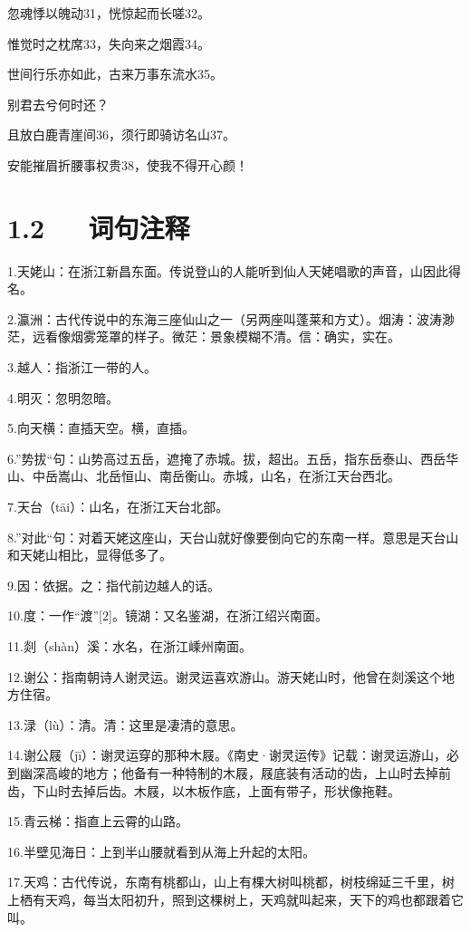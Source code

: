 \documentclass[letterpaper,12pt,english]{sphinxmanual}
\begin{document}
忽魂悸以魄动31，恍惊起而长嗟32。

惟觉时之枕席33，失向来之烟霞34。

世间行乐亦如此，古来万事东流水35。

别君去兮何时还？

且放白鹿青崖间36，须行即骑访名山37。

安能摧眉折腰事权贵38，使我不得开心颜！


\section{1.2   词句注释}
\label{\detokenize{p01_u6563_u6587/_u674e_u767d-_u68a6_u6e38_u5929_u59e5_u541f_u7559_u522b:id4}}
1.天姥山：在浙江新昌东面。传说登山的人能听到仙人天姥唱歌的声音，山因此得名。

2.瀛洲：古代传说中的东海三座仙山之一（另两座叫蓬莱和方丈）。烟涛：波涛渺茫，远看像烟雾笼罩的样子。微茫：景象模糊不清。信：确实，实在。

3.越人：指浙江一带的人。

4.明灭：忽明忽暗。

5.向天横：直插天空。横，直插。

6.”势拔“句：山势高过五岳，遮掩了赤城。拔，超出。五岳，指东岳泰山、西岳华山、中岳嵩山、北岳恒山、南岳衡山。赤城，山名，在浙江天台西北。

7.天台（tāi）：山名，在浙江天台北部。

8.”对此“句：对着天姥这座山，天台山就好像要倒向它的东南一样。意思是天台山和天姥山相比，显得低多了。

9.因：依据。之：指代前边越人的话。

10.度：一作“渡”{[}2{]}。镜湖：又名鉴湖，在浙江绍兴南面。

11.剡（shàn）溪：水名，在浙江嵊州南面。

12.谢公：指南朝诗人谢灵运。谢灵运喜欢游山。游天姥山时，他曾在剡溪这个地方住宿。

13.渌（lù）：清。清：这里是凄清的意思。

14.谢公屐（jī）：谢灵运穿的那种木屐。《南史·谢灵运传》记载：谢灵运游山，必到幽深高峻的地方；他备有一种特制的木屐，屐底装有活动的齿，上山时去掉前齿，下山时去掉后齿。木屐，以木板作底，上面有带子，形状像拖鞋。

15.青云梯：指直上云霄的山路。

16.半壁见海日：上到半山腰就看到从海上升起的太阳。

17.天鸡：古代传说，东南有桃都山，山上有棵大树叫桃都，树枝绵延三千里，树上栖有天鸡，每当太阳初升，照到这棵树上，天鸡就叫起来，天下的鸡也都跟着它叫。
\end{document}
